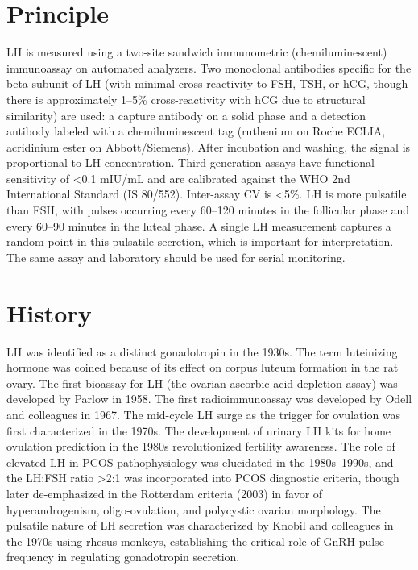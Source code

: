 \section*{Principle}
LH is measured using a two-site sandwich immunometric (chemiluminescent) immunoassay on automated analyzers. Two monoclonal antibodies specific for the beta subunit of LH (with minimal cross-reactivity to FSH, TSH, or hCG, though there is approximately 1--5\% cross-reactivity with hCG due to structural similarity) are used: a capture antibody on a solid phase and a detection antibody labeled with a chemiluminescent tag (ruthenium on Roche ECLIA, acridinium ester on Abbott/Siemens). After incubation and washing, the signal is proportional to LH concentration. Third-generation assays have functional sensitivity of <0.1 mIU/mL and are calibrated against the WHO 2nd International Standard (IS 80/552). Inter-assay CV is <5\%. LH is more pulsatile than FSH, with pulses occurring every 60--120 minutes in the follicular phase and every 60--90 minutes in the luteal phase. A single LH measurement captures a random point in this pulsatile secretion, which is important for interpretation. The same assay and laboratory should be used for serial monitoring.

\section*{History}
LH was identified as a distinct gonadotropin in the 1930s. The term luteinizing hormone was coined because of its effect on corpus luteum formation in the rat ovary. The first bioassay for LH (the ovarian ascorbic acid depletion assay) was developed by Parlow in 1958. The first radioimmunoassay was developed by Odell and colleagues in 1967. The mid-cycle LH surge as the trigger for ovulation was first characterized in the 1970s. The development of urinary LH kits for home ovulation prediction in the 1980s revolutionized fertility awareness. The role of elevated LH in PCOS pathophysiology was elucidated in the 1980s--1990s, and the LH:FSH ratio >2:1 was incorporated into PCOS diagnostic criteria, though later de-emphasized in the Rotterdam criteria (2003) in favor of hyperandrogenism, oligo-ovulation, and polycystic ovarian morphology. The pulsatile nature of LH secretion was characterized by Knobil and colleagues in the 1970s using rhesus monkeys, establishing the critical role of GnRH pulse frequency in regulating gonadotropin secretion.

